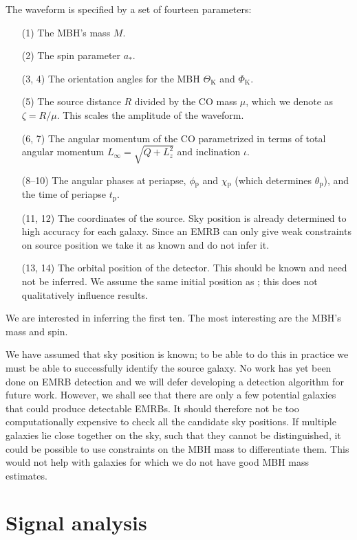 \documentclass[useAMS,usedcolumn,usegraphicx,usenatbib]{mn2e}
\newcommand{\sub}[1]{\ensuremath{_\mathrm{#1}}}
\begin{document}
The waveform is specified by a set of fourteen parameters:
\begin{enumerate}
\item[(1)] The MBH's mass $M$.
\item[(2)] The spin parameter $a_\ast$.
\item[(3, 4)] The orientation angles for the MBH $\Theta\sub{K}$ and $\Phi\sub{K}$.
\item[(5)] The source distance $R$ divided by the CO mass $\mu$, which we denote as $\zeta = R/\mu$. This scales the amplitude of the waveform.
\item[(6, 7)] The angular momentum of the CO parametrized in terms of total angular momentum $L_\infty = \sqrt{Q + L_z^2}$ and inclination $\iota$.
\item[(8--10)] The angular phases at periapse, $\phi\sub{p}$  and $\chi\sub{p}$ (which determines $\theta\sub{p}$), and the time of periapse $t\sub{p}$.
\item[(11, 12)] The coordinates of the source. Sky position is already determined to high accuracy for each galaxy. Since an EMRB can only give weak constraints on source position we take it as known and do not infer it.
\item[(13, 14)] The orbital position of the detector. This should be known and need not be inferred. We assume the same initial position as \citet{Cutler1998}; this does not qualitatively influence results.
\end{enumerate}
We are interested in inferring the first ten. The most interesting are the MBH's mass and spin.

We have assumed that sky position is known; to be able to do this in practice we must be able to successfully identify the source galaxy. No work has yet been done on EMRB detection and we will defer developing a detection algorithm for future work. However, we shall see that there are only a few potential galaxies that could produce detectable EMRBs. It should therefore not be too computationally expensive to check all the candidate sky positions. If multiple galaxies lie close together on the sky, such that they cannot be distinguished, it could be possible to use constraints on the MBH mass to differentiate them. This would not help with galaxies for which we do not have good MBH mass estimates.

\section{Signal analysis}\label{sec:Sig}
\end{document}
